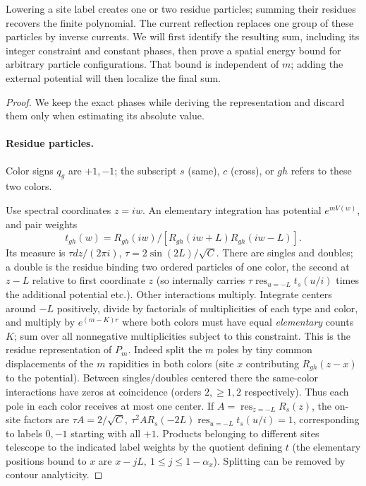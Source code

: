 Lowering a site label creates one or two residue particles; summing their
residues recovers the finite polynomial. The current reflection replaces
one group of these particles by inverse currents. We will first identify
the resulting sum, including its integer constraint and constant phases,
then prove a spatial energy bound for arbitrary particle configurations.
That bound is independent of \(m\); adding the external potential will
then localize the final sum.
\begin{proof}
We keep the exact phases while deriving the representation and discard
them only when estimating its absolute value.
\paragraph{Residue particles.}
Color signs \(q_g\) are \(+1,-1\); the subscript \(s\) (same), \(c\) (cross), or \(g h\) refers to these two colors.

Use spectral coordinates \(z=iw\). An elementary integration has potential \(e^{m V(w)}\), and pair weights
\[
 t_{gh}(w)=R_{gh}(iw)/[R_{gh}(iw+L)R_{gh}(iw-L)].
\]
Its measure is \(\tau dz/(2\pi i)\), \(\tau=2\sin(2L)/\sqrt C\). There are singles and doubles; a double is the residue binding two ordered particles of one color, the second at \(z-L\) relative to first coordinate \(z\) (so internally carries \(\tau\operatorname{res}_{u=-L}t_s(u/i)\) times the additional potential etc.). Other interactions multiply. Integrate centers around \(-L\) positively, divide by factorials of multiplicities of each type and color, and multiply by \(e^{(m-K)r}\) where both colors must have equal \emph{elementary} counts \(K\); sum over all nonnegative multiplicities subject to this constraint. This is the residue representation of \(P_m\). Indeed split the \(m\) poles by tiny common displacements of the \(m\) rapidities in both colors (site \(x\) contributing \(R_{gh}(z-x)\) to the potential). Between singles/doubles centered there the same-color interactions have zeros at coincidence (orders \(2,\ge1,2\) respectively). Thus each pole in each color receives at most one center. If \(A=\operatorname{res}_{z=-L}R_s(z)\), the on-site factors are \(\tau A=2/\sqrt C,\ \tau^2 A R_s(-2L)\operatorname{res}_{u=-L}t_s(u/i)=1\), corresponding to labels \(0,-1\) starting with all \(+1\). Products belonging to different sites telescope to the indicated label weights by the quotient defining \(t\) (the elementary positions bound to \(x\) are \(x-jL,\ 1\le j\le1-\alpha_x\)). Splitting can be removed by contour analyticity.


\end{proof}
